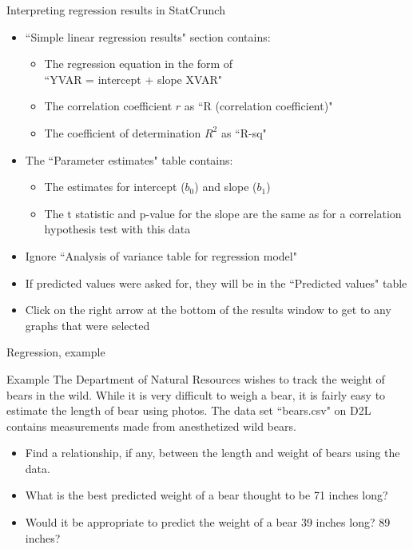 \documentclass[xcolor=table]{beamer}
\begin{document}
\begin{frame}{Interpreting regression results in StatCrunch}
\begin{block}{}
\begin{itemize}
\item ``Simple linear regression results" section contains:
\begin{itemize}
\item The regression equation in the form of\\ ``YVAR = intercept + slope XVAR"
\item The correlation coefficient $r$ as ``R (correlation coefficient)"
\item The coefficient of determination $R^2$ as ``R-sq"
\end{itemize}
\item The ``Parameter estimates" table contains:
\begin{itemize}
\item The estimates for intercept ($b_0$) and slope ($b_1$)
\item The t statistic and p-value for the slope are the same as for a correlation hypothesis test with this data
\end{itemize}
\item Ignore ``Analysis of variance table for regression model"
\item If predicted values were asked for, they will be in the ``Predicted values" table
\item Click on the right arrow at the bottom of the results window to get to any graphs that were selected
\end{itemize}
\end{block}
\end{frame}

\begin{frame}{Regression, example}
\begin{exampleblock}{Example}
The Department of Natural Resources wishes to track the weight of bears in the wild. While it is very difficult to weigh a bear, it is fairly easy to estimate the length of bear using photos. The data set ``bears.csv" on D2L contains measurements made from anesthetized wild bears.\\
\begin{itemize}
\item Find a relationship, if any, between the length and weight of bears using the data.
\item What is the best predicted weight of a bear thought to be 71 inches long?
\item Would it be appropriate to predict the weight of a bear 39 inches long? 89 inches?
\end{itemize}
\end{exampleblock}
\end{frame}
\end{document}
